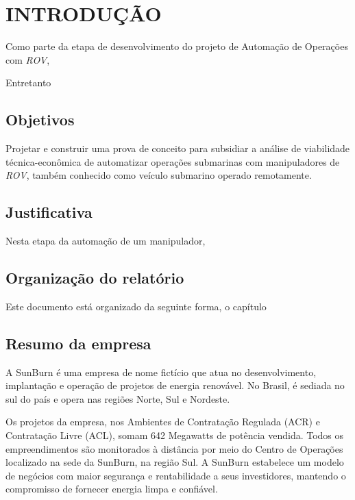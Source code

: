 \chapter{INTRODUÇÃO}
\label{chap:intro}
Como parte da etapa de desenvolvimento do projeto de Automação de Operações com \textit{\acs{ROV}}, \cite{pybullet}

\cite{sivvcev2018underwater}

Entretanto

\section{Objetivos}
\label{sec:obj}
Projetar e construir uma prova de conceito para subsidiar a análise de viabilidade técnica-econômica de automatizar operações submarinas com manipuladores de \textit{\acs{ROV}}, também conhecido como veículo submarino operado remotamente.


\section{Justificativa} %
\label{sec:just}
Nesta etapa da automação de um manipulador, 


\section{Organização do relatório}
\label{sec:org}
Este documento está organizado da seguinte forma, o capítulo 

\section{Resumo da empresa}
\label{sec:rese}
A SunBurn é uma empresa de nome fictício que atua no desenvolvimento, implantação e operação de projetos de energia renovável. No Brasil, é sediada no sul do país e opera nas regiões Norte, Sul e Nordeste.

Os projetos da empresa, nos Ambientes de Contratação Regulada (ACR) e Contratação Livre (ACL), somam 642 Megawatts de potência vendida. Todos os empreendimentos são monitorados à distância por meio do Centro de Operações localizado na sede da SunBurn, na região Sul.
A SunBurn estabelece um modelo de negócios com maior segurança e rentabilidade a seus investidores, mantendo o compromisso de fornecer energia limpa e confiável.

